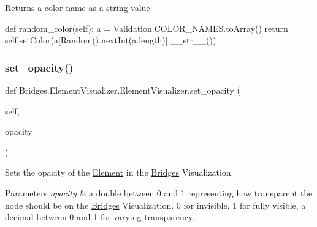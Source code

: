 \begin{DoxyReturn}{Returns}
a color name as a string value
\end{DoxyReturn}
def random\+\_\+color(self)\+: a = Validation.\+C\+O\+L\+O\+R\+\_\+\+N\+A\+M\+E\+S.\+to\+Array() return self.\+set\+Color(a\mbox{[}Random().next\+Int(a.\+length)\mbox{]}.\+\_\+\+\_\+str\+\_\+\+\_\+()) \mbox{\label{class_bridges_1_1_element_visualizer_1_1_element_visualizer_a35f9781eaadd9ce1149cfbc8475a3c51}} 
\subsubsection{\texorpdfstring{set\+\_\+opacity()}{set\_opacity()}}
{\footnotesize\ttfamily def Bridges.\+Element\+Visualizer.\+Element\+Visualizer.\+set\+\_\+opacity (\begin{DoxyParamCaption}\item[{}]{self,  }\item[{}]{opacity }\end{DoxyParamCaption})}



Sets the opacity of the \mbox{\hyperlink{namespace_bridges_1_1_element}{Element}} in the \mbox{\hyperlink{namespace_bridges_1_1_bridges}{Bridges}} Visualization. 


\begin{DoxyParams}{Parameters}
{\em opacity} & a double between 0 and 1 representing how transparent the node should be on the \mbox{\hyperlink{namespace_bridges_1_1_bridges}{Bridges}} Visualization. 0 for invisible, 1 for fully visible, a decimal between 0 and 1 for varying transparency. \\
\hline
\end{DoxyParams}
\mbox{\label{class_bridges_1_1_element_visualizer_1_1_element_visualizer_a82348f58c951b0608ec4fb04eaa3e097}} 
